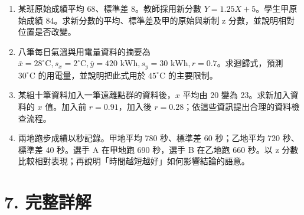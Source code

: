 \documentclass[11pt,a4paper]{article}
\providecommand{\tightlist}{%
  \setlength{\itemsep}{0pt}\setlength{\parskip}{0pt}}
\begin{document}
\begin{enumerate}
\def\labelenumi{\arabic{enumi}.}
\setcounter{enumi}{12}
\tightlist
\item
  某班原始成績平均 68、標準差 8。教師採用新分數 \(Y=1.25X+5\)。學生甲原始成績 84。求新分數的平均、標準差及甲的原始與新制 z 分數，並說明相對位置是否改變。
\item
  八筆每日氣溫與用電量資料的摘要為 \(\bar x=28^\circ\mathrm C,s_x=2^\circ\mathrm C,\bar y=420\text{ kWh},s_y=30\text{ kWh},r=0.7\)。求迴歸式，預測 \(30^\circ\mathrm C\) 的用電量，並說明把此式用於 \(45^\circ\mathrm C\) 的主要限制。
\item
  某組十筆資料加入一筆遠離點群的資料後，\(x\) 平均由 20 變為 23。求新加入資料的 \(x\) 值。加入前 \(r=0.91\)，加入後 \(r=0.28\)；依這些資訊提出合理的資料檢查流程。
\item
  兩地跑步成績以秒記錄。甲地平均 780 秒、標準差 60 秒；乙地平均 720 秒、標準差 40 秒。選手 A 在甲地跑 690 秒，選手 B 在乙地跑 660 秒。以 z 分數比較相對表現；再說明「時間越短越好」如何影響結論的語意。
\end{enumerate}

\section{7. 完整詳解}\label{ux5b8cux6574ux8a73ux89e3}
\end{document}
